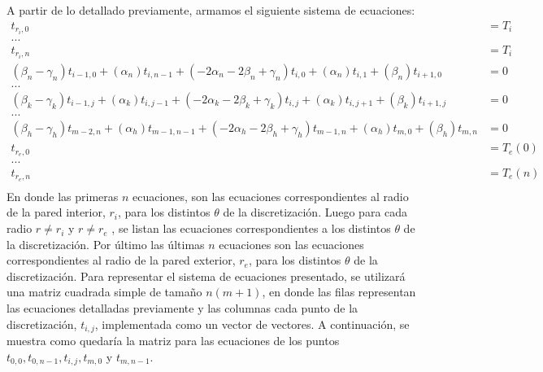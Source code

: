 A partir de lo detallado previamente, armamos el siguiente sistema de ecuaciones:
\begingroup
    \fontsize{8pt}{10pt}\selectfont
    \begin{equation*}
        \begin{aligned}
          t_{r_{i},0} &= T_{i} \\
          ...& \\
          t_{r_{i},n} &= T_{i} \\
          (\beta_{n} - \gamma_{n})t_{i-1,0} + (\alpha_{n})t_{i,n-1} + (-2\alpha_{n}-2\beta_{n}+\gamma_{n})t_{i,0} + (\alpha_{n})t_{i,1} + (\beta_{n})t_{i+1,0} &= 0\\
          ...& \\
          (\beta_{k} - \gamma_{k})t_{i-1,j} + (\alpha_{k})t_{i,j-1} + (-2\alpha_{k}-2\beta_{k}+\gamma_{k})t_{i,j} + (\alpha_{k})t_{i,j+1} + (\beta_{k})t_{i+1,j} &= 0\\
          ...& \\
          (\beta_{h} - \gamma_{h})t_{m-2,n} + (\alpha_{h})t_{m-1,n-1} + (-2\alpha_{h}-2\beta_{h}+\gamma_{h})t_{m-1,n} + (\alpha_{h})t_{m,0} + (\beta_{h})t_{m,n} &= 0\\
          t_{r_{e},0} &= T_{e}(0) \\
          ...& \\
          t_{r_{e},n} &= T_{e}(n) \\
        \end{aligned}
    \end{equation*}
  \endgroup
En donde las primeras $n$ ecuaciones, son las ecuaciones correspondientes al radio de la pared interior, $r_{i}$, para los distintos $\theta$ de la discretización. Luego para cada radio $r \neq r_{i}$ y $r \neq r_{e}$ , se listan las ecuaciones correspondientes a los distintos $\theta$ de la discretización. Por último las últimas $n$ ecuaciones son las ecuaciones correspondientes al radio de la pared exterior, $r_{e}$, para los distintos $\theta$ de la discretización.
\newline
\newline
Para representar el sistema de ecuaciones presentado, se utilizará una matriz cuadrada simple de tamaño $n(m+1)$, en donde las filas representan las ecuaciones detalladas previamente y las columnas cada punto de la discretización, $t_{i,j}$, implementada como un vector de vectores. A continuación, se muestra como quedaría la matriz para las ecuaciones de los puntos $t_{0,0}, t_{0,n-1}, t_{i,j}, t_{m,0}$ y $t_{m,n-1}$.

